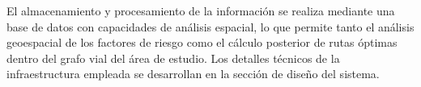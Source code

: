 
El almacenamiento y procesamiento de la información se realiza mediante una base de datos con capacidades de análisis espacial, lo que permite tanto el análisis geoespacial de los factores de riesgo como el cálculo posterior de rutas óptimas dentro del grafo vial del área de estudio. Los detalles técnicos de la infraestructura empleada se desarrollan en la sección de diseño del sistema.
